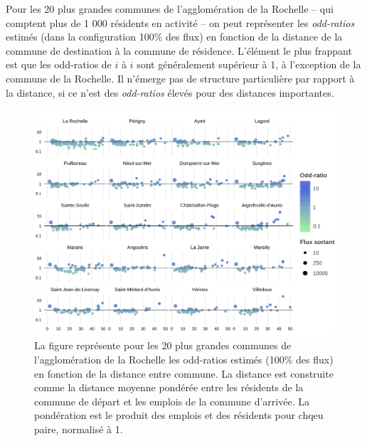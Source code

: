 \documentclass[
  10pt,
  a4paper,
  numbers=noendperiod,
  DIV=12]{scrartcl}
\begin{document}
Pour les 20 plus grandes communes de l'agglomération de la Rochelle --
qui comptent plus de 1 000 résidents en activité -- on peut représenter
les \emph{odd-ratios} estimés (dans la configuration 100\% des flux) en
fonction de la distance de la commune de destination à la commune de
résidence. L'élément le plus frappant est que les odd-ratios de \(i\) à
\(i\) sont généralement supérieur à 1, à l'exception de la commune de la
Rochelle. Il n'émerge pas de structure particulière par rapport à la
distance, si ce n'est des \emph{odd-ratios} élevés pour des distances
importantes.

\begin{figure}[htb]

{\centering \includegraphics[width=1\textwidth,height=\textheight]{output/spectre100.png}

}

\caption[Odd-ratio en fonction de la distance
(spectre)]{\label{fig-spectre}La figure représente pour les 20 plus
grandes communes de l'agglomération de la Rochelle les odd-ratios
estimés (100\% des flux) en fonction de la distance entre commune. La
distance est construite comme la distance moyenne pondérée entre les
résidents de la commune de départ et les emplois de la commune
d'arrivée. La pondération est le produit des emplois et des résidents
pour chqeu paire, normalisé à 1.}

\end{figure}
\end{document}
